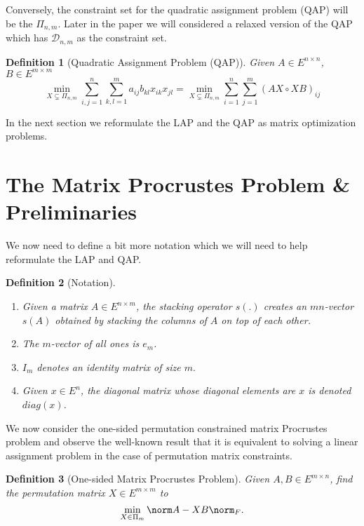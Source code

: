 \documentclass{amsart}
\theoremstyle{plain} \newtheorem{Exa}{Example}[section]
\newtheorem{Def}{Definition}[section]
\begin{document}
Conversely, the constraint set for the quadratic assignment problem (QAP)
will be the $\Pi_{n,m}.$  Later in the paper we will considered
a relaxed version of the QAP which has $\mathcal D_{n,m}$ as the
constraint set.

\begin{Def} [Quadratic Assignment Problem (QAP)]
Given $A \in E^{n \times n}$, $B \in E^{m \times m}$
$$
\min_{X \subsetneq \Pi_{n,m}}
\sum_{i,j=1}^n \sum_{k,l=1}^m a_{ij} b_{kl} x_{ik} x_{jl}
=
\min_{X \subsetneq \Pi_{n,m}}
\sum_{i=1}^n \sum_{j=1}^m (AX \circ XB)_{ij}
$$
\end{Def}

In the next section we reformulate the LAP and the QAP as matrix
optimization problems.
\section{The Matrix Procrustes Problem \& Preliminaries}

We now need to define a bit more notation which we will need to help
reformulate the LAP and QAP.

\begin{Def} [Notation] \hskip 4in
\begin{enumerate}
\item Given a matrix $A \in E^{n \times m}$, the
stacking operator $s(.)$ creates an $mn$-vector $s(A)$ obtained by
stacking the columns of $A$ on top of each other.
\item The $m$-vector of all ones is $e_m$.
\item $I_{m}$ denotes an identity matrix of size $m.$ 
\item Given $x \in E^n$, the diagonal matrix whose diagonal elements are $x$
is denoted $diag(x)$.
\end{enumerate}
\end{Def}

We now consider the one-sided permutation constrained matrix Procrustes problem and
observe the well-known result that
it is equivalent to solving a linear assignment problem
in the case of permutation matrix constraints.

\begin{Def} [One-sided Matrix Procrustes Problem]
Given $A,B \in E^{m \times n}$,
find the permutation matrix $X\in E^{m \times m}$ to
$$\min_{X \in \Pi_m} \norm A-XB \norm_F . $$
\end{Def}
\end{document}
